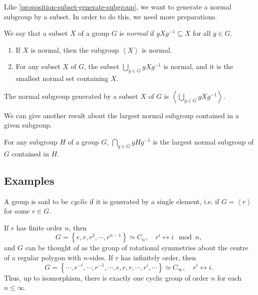 Like \ref{proposition-subset-generate-subgroup}, we want to generate a normal subgroup by a subset.
In order to do this, we need more preparations.

\begin{definition}
  \label{definition-normal-subset}
  We say that a subset \( X \) of a group \( G \) is \emph{normal} if \( gXg^{-1} \subseteq X \) for all \( g \in G \).
\end{definition}

\begin{lemma}
  \label{lemma-set-generate-normal-subgroup}
  \begin{enumerate}
    \item If \( X \) is normal, then the subgroup \( \left\langle X \right\rangle \) is normal.
    \item For any subset \( X \) of \( G \), the subset \( \bigcup_{g \in G} g X g^{-1} \) is normal, and it is the smallest normal set containing \( X \).
  \end{enumerate}
\end{lemma}

\begin{proposition}
  \label{proposition-set-generate-normal-subgroup}
  The normal subgroup generated by a subset \( X \) of \( G \) is \( \left\langle \bigcup_{g \in G} g X g^{-1} \right\rangle \).
\end{proposition}

We can give another result about the largest normal subgroup contained in a given subgroup.
\begin{lemma}
  \label{lemma-largest-normal-subgroup-in-subgroup}
  For any subgroup \( H \) of a group \( G \), \( \bigcap_{g \in G}g H g^{-1} \) is the largest normal subgroup of \( G \) contained in \( H \).
\end{lemma}

\subsection{Examples}
\label{subsection-examples}

\begin{definition}
  \label{definition-cyclic-group}
  A group is said to be \emph{cyclic} if it is generated by a single element, i.e. if \( G = \left\langle r \right\rangle \) for some \( r \in G \).
\end{definition}

If \( r \) has finite order \( n \), then
\[
  G = \left\lbrace e, r, r^2, \cdots, r^{n - 1} \right\rbrace \simeq C_n,\quad r^i \leftrightarrow i \mod{n},
\]
and \( G \) can be thought of as the group of rotational symmetries about the centre of a regular polygon with \( n \)-sides.
If \( r \) has infinitely order, then
\[
  G = \left\lbrace \cdots, r^{-i}, \cdots, r^{-1}, \cdots, e, r, r, \cdots, r^i, \cdots \right\rbrace \simeq C_\infty,\quad r^i \leftrightarrow i.
\]
Thus, up to isomorphism, there is exactly one cyclic group of order \( n \)  for each \( n \leq \infty \).

